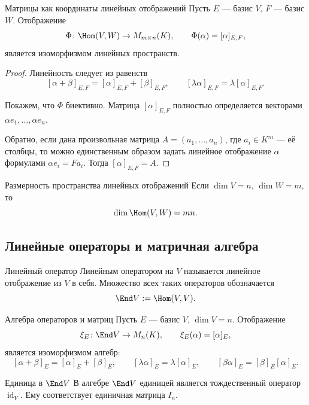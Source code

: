 \begin{Theorem}{Матрицы как координаты линейных отображений}{}
	Пусть $E$ --- базис $V$, $F$ --- базис $W$.
	Отображение
	\[
	\Phi\colon \Hom(V,W)\to M_{m\times n}(K),
	\qquad
	\Phi(\alpha)=[\alpha]_{E,F},
	\]
	является изоморфизмом линейных пространств.
\end{Theorem}

\begin{proof}
	Линейность следует из равенств
	\[
	[\alpha+\beta]_{E,F}=[\alpha]_{E,F}+[\beta]_{E,F},
	\qquad
	[\lambda\alpha]_{E,F}=\lambda[\alpha]_{E,F}.
	\]
	
	Покажем, что $\Phi$ биективно.
	Матрица $[\alpha]_{E,F}$ полностью определяется векторами
	$\alpha e_1,\ldots,\alpha e_n$.
	
	Обратно, если дана произвольная матрица $A=(a_1,\ldots,a_n)$,
	где $a_i\in K^m$ --- её столбцы, то можно единственным образом задать линейное отображение $\alpha$ формулами
	$\alpha e_i=Fa_i$.
	Тогда $[\alpha]_{E,F}=A$.
\end{proof}

\begin{Corollary}{Размерность пространства линейных отображений}{}
	Если $\dim V=n$, $\dim W=m$, то
	\[
	\dim \Hom(V,W)=mn.
	\]
\end{Corollary}

\subsection{Линейные операторы и матричная алгебра}

\begin{Definition}{Линейный оператор}{}
	Линейным оператором на $V$ называется линейное отображение из $V$ в себя.
	Множество всех таких операторов обозначается
	\[
	\End V:=\Hom(V,V).
	\]
\end{Definition}

\begin{Proposition}{Алгебра операторов и матриц}{}
	Пусть $E$ --- базис $V$, $\dim V=n$.
	Отображение
	\[
	\xi_E\colon \End V\to M_n(K),
	\qquad
	\xi_E(\alpha)=[\alpha]_E,
	\]
	является изоморфизмом алгебр:
	\[
	[\alpha+\beta]_E=[\alpha]_E+[\beta]_E,
	\qquad
	[\lambda\alpha]_E=\lambda[\alpha]_E,
	\qquad
	[\beta\alpha]_E=[\beta]_E[\alpha]_E.
	\]
\end{Proposition}

\begin{Remark}{Единица в $\End V$}{}
	В алгебре $\End V$ единицей является тождественный оператор $\operatorname{id}_V$.
	Ему соответствует единичная матрица $I_n$.
\end{Remark}


